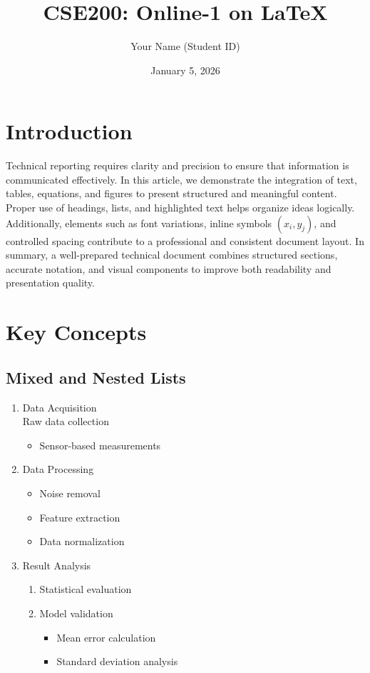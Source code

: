 \documentclass[11pt]{article}
\title{CSE200: Online-1 on \LaTeX}
\author{Your Name (Student ID)}
\date{January 5, 2026}
\begin{document}
\maketitle

\section{Introduction}
Technical reporting requires clarity and precision to ensure that information is communicated effectively. In this article, we demonstrate the integration of text, tables, equations, and figures to present structured and meaningful content. Proper use of headings, lists, and highlighted text helps organize ideas logically. Additionally, elements such as font variations, inline symbols $(x_{i},y_{j})$, and controlled spacing contribute to a professional and consistent document layout. In summary, a well-prepared technical document combines structured sections, accurate notation, and visual components to improve both readability and presentation quality.

\section{Key Concepts}

\subsection{Mixed and Nested Lists}
\begin{enumerate}
    \item Data Acquisition \\
    Raw data collection
    \begin{itemize}
        \item Sensor-based measurements
    \end{itemize}
    \item Data Processing
    \begin{itemize}
        \item[z:] Noise removal
        \item[y:] Feature extraction
        \item[x:] Data normalization
    \end{itemize}
    \item Result Analysis
    \begin{enumerate}
        \item[(a)] Statistical evaluation
        \item[(b)] Model validation
        \begin{itemize}
            \item Mean error calculation
            \item Standard deviation analysis
        \end{itemize}
    \end{enumerate}
\end{enumerate}
\end{document}
